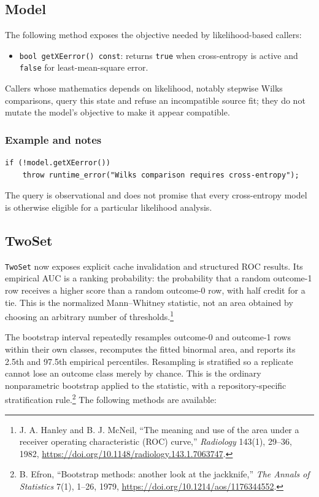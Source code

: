 \subsection{Model}
The following method exposes the objective needed by likelihood-based callers:

\begin{itemize}
\item \texttt{bool getXEerror() const}: returns \texttt{true} when
      cross-entropy is active and \texttt{false} for least-mean-square error.
\end{itemize}

Callers whose mathematics depends on likelihood, notably stepwise Wilks
comparisons, query this state and refuse an incompatible source fit; they do not
mutate the model's objective to make it appear compatible.

\subsubsection{Example and notes}
\begin{verbatim}
if (!model.getXEerror())
    throw runtime_error("Wilks comparison requires cross-entropy");
\end{verbatim}
The query is observational and does not promise that every cross-entropy model
is otherwise eligible for a particular likelihood analysis.

\subsection{TwoSet}
\texttt{TwoSet} now exposes explicit cache invalidation and structured ROC
results.  Its empirical AUC is a ranking probability: the probability that a
random outcome-1 row receives a higher score than a random outcome-0 row, with
half credit for a tie.  This is the normalized Mann--Whitney statistic, not an
area obtained by choosing an arbitrary number of thresholds.\footnote{J. A.
Hanley and B. J. McNeil, ``The meaning and use of the area under a receiver
operating characteristic (ROC) curve,'' \emph{Radiology} 143(1), 29--36,
1982, \url{https://doi.org/10.1148/radiology.143.1.7063747}.}

The bootstrap interval repeatedly resamples outcome-0 and outcome-1 rows within
their own classes, recomputes the fitted binormal area, and reports its 2.5th and
97.5th empirical percentiles.  Resampling is stratified so a replicate cannot
lose an outcome class merely by chance.  This is the ordinary nonparametric
bootstrap applied to the statistic, with a repository-specific stratification
rule.\footnote{B. Efron, ``Bootstrap methods: another look at the jackknife,''
\emph{The Annals of Statistics} 7(1), 1--26, 1979,
\url{https://doi.org/10.1214/aos/1176344552}.} The following methods are
available:


